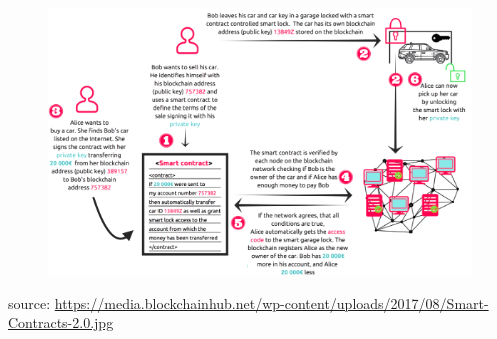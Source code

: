 \documentclass[9pt]{beamer}
\begin{document}




\begin{frame}
	\begin{figure}[]
		\centering
		\includegraphics  [scale=0.5]{Images/smart4}
	\end{figure}
	\begin{scriptsize}
		source: \href{https://blockchainhub.net/blog/infographics/smart-contracts-explained/}{https://media.blockchainhub.net/wp-content/uploads/2017/08/Smart-Contracts-2.0.jpg}
	\end{scriptsize}
\end{frame}


\end{document}
